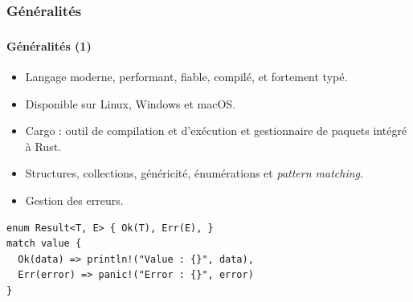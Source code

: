 \documentclass[10pt]{beamer}
\begin{document}
\subsubsection{Généralités}
\begin{frame}[fragile]
    \frametitle{\subsecname}
    \framesubtitle{Généralités (1)}
    \begin{itemize}
        \item Langage moderne, performant, fiable, compilé, et fortement typé.
        \pause
        \item Disponible sur Linux, Windows et macOS.
        \pause
        \item Cargo : outil de compilation et d'exécution et gestionnaire de paquets intégré à Rust.
        \pause
        \item Structures, collections, généricité, énumérations et \textit{pattern matching}.
        \pause
        \item Gestion des erreurs.
    \end{itemize}
    \pause
    \begin{verbatim}
enum Result<T, E> { Ok(T), Err(E), }
match value {
  Ok(data) => println!("Value : {}", data),
  Err(error) => panic!("Error : {}", error)
}
    \end{verbatim}

\end{frame}

\end{document}
